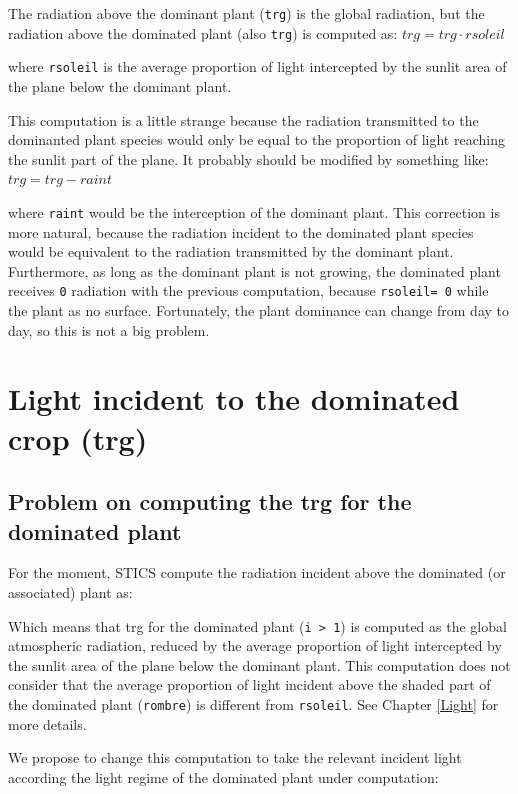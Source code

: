 \documentclass[]{book}
\theoremstyle{definition}
\theoremstyle{definition}
\theoremstyle{definition}
\theoremstyle{remark}
\begin{document}
The radiation above the dominant plant (\texttt{trg}) is the global
radiation, but the radiation above the dominated plant (also
\texttt{trg}) is computed as: \(trg=trg\cdot rsoleil\)

where \texttt{rsoleil} is the average proportion of light intercepted by
the sunlit area of the plane below the dominant plant.

This computation is a little strange because the radiation transmitted
to the dominanted plant species would only be equal to the proportion of
light reaching the sunlit part of the plane. It probably should be
modified by something like: \(trg= trg-raint\)

where \texttt{raint} would be the interception of the dominant plant.
This correction is more natural, because the radiation incident to the
dominated plant species would be equivalent to the radiation transmitted
by the dominant plant. Furthermore, as long as the dominant plant is not
growing, the dominated plant receives \texttt{0} radiation with the
previous computation, because \texttt{rsoleil=\ 0} while the plant as no
surface. Fortunately, the plant dominance can change from day to day, so
this is not a big problem.

\chapter{Light incident to the dominated crop
(trg)}\label{light-incident-to-the-dominated-crop-trg}

\section{Problem on computing the trg for the dominated
plant}\label{problem-on-computing-the-trg-for-the-dominated-plant}

For the moment, STICS compute the radiation incident above the dominated
(or associated) plant as:

Which means that trg for the dominated plant
(\texttt{i\ \textgreater{}\ 1}) is computed as the global atmospheric
radiation, reduced by the average proportion of light intercepted by the
sunlit area of the plane below the dominant plant. This computation does
not consider that the average proportion of light incident above the
shaded part of the dominated plant (\texttt{rombre}) is different from
\texttt{rsoleil}. See Chapter \ref{Light} for more details.

We propose to change this computation to take the relevant incident
light according the light regime of the dominated plant under
computation:
\end{document}
